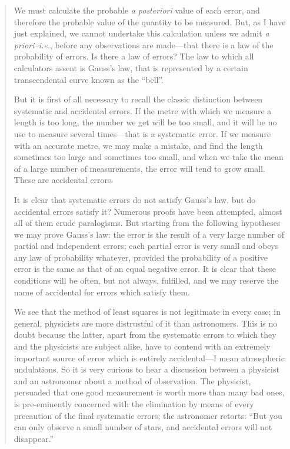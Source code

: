 \documentclass{article}
\begin{document}
 \begin{quote}
     We must calculate the probable \emph{a posteriori} value of each error, and therefore the probable value of the quantity to be measured.  But, as I have just explained, we cannot undertake this calculation unless we admit \emph{a priori--i.e.}, before any observations are made---that there is a law of the probability of errors.  Is there a law of errors?  The law to which all calculators assent is Gauss's law, that is represented by a certain transcendental curve known as the ``bell''.
     
     But it is first of all necessary to recall the classic distinction between systematic and accidental errors.  If the metre with which we measure a length is too long, the number we get will be too small, and it will be no use to measure several times---that is a systematic error.  If we measure with an accurate metre, we may make a mistake, and find the length sometimes too large and sometimes too small, and when we take the mean of a large number of measurements, the error will tend to grow small.  These are accidental errors.  
     
     It is clear that systematic errors do not satisfy Gauss's law, but do accidental errors satisfy it?  Numerous proofs have been attempted, almost all of them crude paralogisms.  But starting from the following hypotheses we may prove Gauss's law: the error is the result of a very large number of partial and independent errors; each partial error is very small and obeys any law of probability whatever, provided the probability of a positive error is the same as that of an equal negative error.  It is clear that these conditions will be often, but not always, fulfilled, and we may reserve the name of accidental for errors which satisfy them.
     
     We see that the method of least squares is not legitimate in every case; in general, physicists are more distrustful of it than astronomers.  This is no doubt because the latter, apart from the systematic errors to which they and the physicists are subject alike, have to contend with an extremely important source of error which is entirely accidental---I mean atmospheric undulations.  So it is very curious to hear a discussion between a physicist and an astronomer about a method of observation.  The physicist, persuaded that one good measurement is worth more than many bad ones, is pre-eminently concerned with the elimination by means of every precaution of the final systematic errors; the astronomer retorts: ``But you can only observe a small number of stars, and accidental errors will not disappear.''
     

\end{quote}
\end{document}

